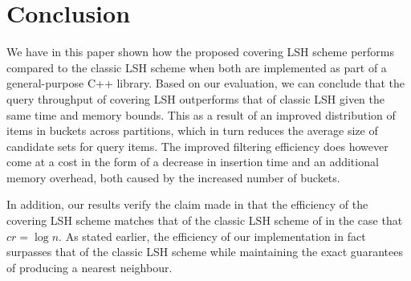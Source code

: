 \section{Conclusion}
\label{conclusion}

We have in this paper shown how the proposed covering LSH scheme performs compared to the classic LSH scheme when both are implemented as part of a general-purpose C++ library. Based on our evaluation, we can conclude that the query throughput of covering LSH outperforms that of classic LSH given the same time and memory bounds. This as a result of an improved distribution of items in buckets across partitions, which in turn reduces the average size of candidate sets for query items. The improved filtering efficiency does however come at a cost in the form of a decrease in insertion time and an additional memory overhead, both caused by the increased number of buckets.

In addition, our results verify the claim made in \cite{DBLP:journals/corr/Pagh15} that the efficiency of the covering LSH scheme matches that of the classic LSH scheme of \cite{DBLP:conf/stoc/IndykM98} in the case that $cr = \log n$. As stated earlier, the efficiency of our implementation in fact surpasses that of the classic LSH scheme while maintaining the exact guarantees of producing a nearest neighbour.
